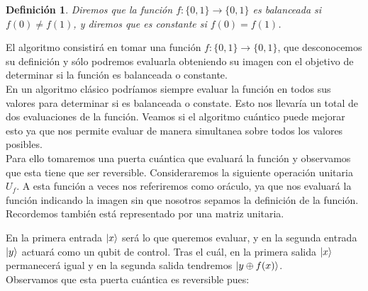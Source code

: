 \documentclass[a4paper]{article}
\newtheorem{deff}{Definición}[section]
\numberwithin{equation}{section}
\begin{document}
\begin{deff}
Diremos que la función $f:\{0, 1\} \rightarrow \{0, 1\}$ es balanceada si $f(0) \neq f(1)$, y diremos que es constante si $f(0) = f(1)$.
\end{deff}
El algoritmo consistirá en tomar una función $f:\{0, 1\} \rightarrow \{0, 1\}$, que desconocemos su definición y sólo podremos evaluarla obteniendo su imagen con el objetivo de determinar si la función es balanceada o constante.\\
En un algoritmo clásico podríamos siempre evaluar la función en todos sus valores para determinar si es balanceada o constate. Esto nos llevaría un total de dos evaluaciones de la función. Veamos si el algoritmo cuántico puede mejorar esto ya que nos permite evaluar de manera simultanea sobre todos los valores posibles.\\
Para ello tomaremos una puerta cuántica que evaluará la función y observamos que esta tiene que ser reversible. Consideraremos la siguiente operación unitaria $U_f$. A esta función a veces nos referiremos como oráculo, ya que nos evaluará la función indicando la imagen sin que nosotros sepamos la definición de la función. Recordemos también está representado por una matriz unitaria.
\begin{figure}[h]
\centering
{}
\end{figure}\linebreak
En la primera entrada $\ket{x}$ será lo que queremos evaluar, y en la segunda entrada $\ket{y}$ actuará como un qubit de control. Tras el cuál, en la primera salida $\ket{x}$ permanecerá igual y en la segunda salida tendremos $\ket{y\oplus f(x)}$.\\
Observamos que esta puerta cuántica es reversible pues:
\end{document}
